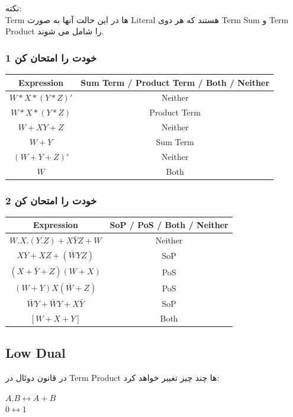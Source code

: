 \documentclass[20pt, a4paper]{article}
\begin{document}
نکته:\\
	Term
ها
در این حالت آنها به صورت Literal هستند که هر دوی Term Sum و Term Product را شامل می شوند.


\subsubsection{1 خودت را امتحان کن}
\center
\begin{LTR}
	\begin{tabular}{ c | c}
		Expression & Sum Term / Product Term / Both / Neither \\
		\hline
		$W*X*(Y*Z)'$ & Neither\\
		$W*X*(Y*Z)$ & Product Term\\
		$W+XY+Z$ & Neither\\
		$W+Y$ & Sum Term\\
		$(W+Y+Z)'$ & Neither\\
		$W$ & Both\\
	\end{tabular}
\end{LTR}

\subsubsection{2 خودت را امتحان کن}
\center
\begin{LTR}
	\begin{tabular}{ c | c}
		Expression & SoP / PoS / Both / Neither \\
		\hline
		$W.X.\bar{(Y.Z)}+X\bar{Y}Z+W$ & Neither \\
		$XY+XZ+(\bar{W}YZ)$ & SoP \\
		$(X+\bar{Y}+Z)(W+X)$ &  PoS\\
		$(W+Y)X(\bar{W}+Z)$ & PoS\\
		$\bar{W}Y+\bar{W}Y + X\bar{Y}$ & SoP\\
		$[W+X+Y]$ & Both
	\end{tabular}
\end{LTR}



\newpage

\raggedleft
\justifying
\subsection{Low Dual}
در قانون دوئال در Term Product ها چند چیز تغییر خواهد کرد:\\

\raggedright
$A.B \leftrightarrow A+B$\\
$0 \leftrightarrow 1$
\end{document}
